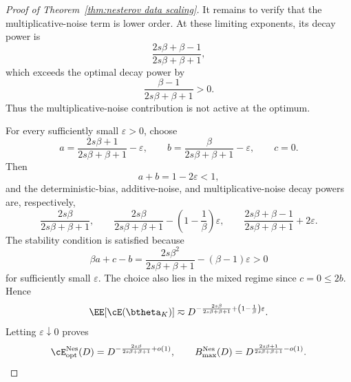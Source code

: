 \begin{proof}[Proof of Theorem~\ref{thm:nesterov data scaling}]
It remains to verify that the multiplicative-noise term is lower order.
At these limiting exponents, its decay power is
\[
\frac{2s\beta+\beta-1}{2s\beta+\beta+1},
\]
which exceeds the optimal decay power by
\[
\frac{\beta-1}{2s\beta+\beta+1}>0.
\]
Thus the multiplicative-noise contribution is not active at the optimum.

For every sufficiently small \(\varepsilon>0\), choose
\[
a=
\frac{2s\beta+1}{2s\beta+\beta+1}-\varepsilon,
\qquad
b=
\frac{\beta}{2s\beta+\beta+1}-\varepsilon,
\qquad
c=0.
\]
Then
\[
a+b=1-2\varepsilon<1,
\]
and the deterministic-bias, additive-noise, and multiplicative-noise decay
powers are, respectively,
\[
\frac{2s\beta}{2s\beta+\beta+1},
\qquad
\frac{2s\beta}{2s\beta+\beta+1}
-\left(1-\frac1\beta\right)\varepsilon,
\qquad
\frac{2s\beta+\beta-1}{2s\beta+\beta+1}
+2\varepsilon.
\]
The stability condition is satisfied because
\[
\beta a+c-b
=
\frac{2s\beta^2}{2s\beta+\beta+1}
-(\beta-1)\varepsilon
>0
\]
for sufficiently small \(\varepsilon\). The choice also lies in the mixed
regime since \(c=0\leq2b\). Hence
\[
\EE[\cE(\btheta_K)]
\eqsim
D^{-\frac{2s\beta}{2s\beta+\beta+1}
+\left(1-\frac1\beta\right)\varepsilon}.
\]
Letting \(\varepsilon\downarrow0\) proves
\[
\cE_{\rm opt}^{\rm Nes}(D)
=
D^{-\frac{2s\beta}{2s\beta+\beta+1}+o(1)},
\qquad
B_{\max}^{\rm Nes}(D)
=
D^{\frac{2s\beta+1}{2s\beta+\beta+1}-o(1)}.
\]
\end{proof}




